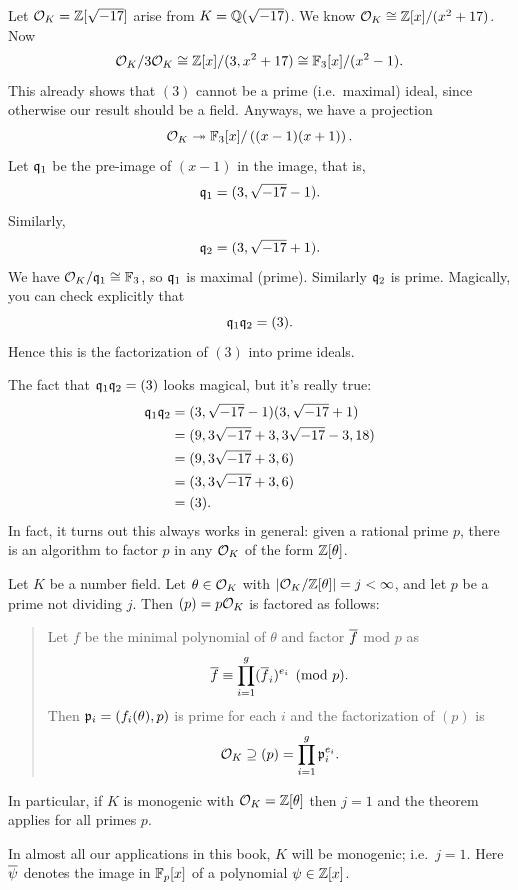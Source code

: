 \begin{example}
	Let $\mathcal O_K = \mathbb Z[\sqrt{-17}]$ arise from $K = \mathbb Q(\sqrt{-17})$.
	We know $\mathcal O_K \cong \mathbb Z[x] / (x^2+17)$.
	Now
	\[
		\mathcal O_K / 3\mathcal O_K \cong \mathbb Z[x] / (3,x^2+17)
		\cong \mathbb F_3[x] / (x^2-1).
	\]
	This already shows that $(3)$ cannot be a prime (i.e.\ maximal) ideal,
	since otherwise our result should be a field.
	Anyways, we have a projection
	\[ \mathcal O_K \twoheadrightarrow \mathbb F_3[x] / \left( (x-1)(x+1) \right). \]
	Let $\mathfrak q_1$ be the pre-image of $(x-1)$ in the image, that is,
	\[ \mathfrak q_1 = (3, \sqrt{-17}-1). \]
	Similarly, \[ \mathfrak q_2 = (3, \sqrt{-17}+1). \]
	We have $\mathcal O_K / \mathfrak q_1 \cong \mathbb F_3$, so $\mathfrak q_1$ is maximal (prime).
	Similarly $\mathfrak q_2$ is prime.
	Magically, you can check explicitly that
	\[ \mathfrak q_1 \mathfrak q_2 = (3). \]
	Hence this is the factorization of $(3)$ into prime ideals.
\end{example}

The fact that $\mathfrak q_1 \mathfrak q_2 = (3)$ looks magical, but it's really true:
\begin{align*}
	\mathfrak q_1\mathfrak q_2
	&= (3, \sqrt{-17}-1) (3, \sqrt{-17}+1) \\
	&= (9, 3\sqrt{-17}+3, 3\sqrt{-17}-3, 18) \\
	&= (9, 3\sqrt{-17}+3, 6) \\
	&= (3, 3\sqrt{-17}+3, 6) \\
	&= (3).
\end{align*}
In fact, it turns out this always works in general:
given a rational prime $p$, there is an algorithm
to factor $p$ in any $\mathcal O_K$ of the form $\mathbb Z[\theta]$.

\begin{theorem}
	\label{thm:factor_alg}
	Let $K$ be a number field.
	Let $\theta \in \mathcal O_K$ with $|\mathcal O_K / \mathbb Z[\theta]| = j < \infty$,
	and let $p$ be a prime not dividing $j$.
	Then $(p) = p \mathcal O_K$ is factored as follows:
	\begin{quote}
		Let $f$ be the minimal polynomial of $\theta$ and
		factor $\overline f$ mod $p$ as
		\[ \overline f \equiv \prod_{i=1}^g (\overline f_i)^{e_i} \pmod p. \]
		Then $\mathfrak p_i = (f_i(\theta), p)$ is prime for each $i$
		and the factorization of $(p)$ is
		\[ \mathcal O_K \supseteq (p) = \prod_{i=1}^g \mathfrak p_i^{e_i}. \]
	\end{quote}
	In particular, if $K$ is monogenic with $\mathcal O_K = \mathbb Z[\theta]$ then $j=1$
	and the theorem applies for all primes $p$.
\end{theorem}
In almost all our applications in this book, $K$ will be monogenic; i.e.\ $j=1$.
Here $\overline \psi$ denotes the image in $\mathbb F_p[x]$ of a polynomial $\psi \in \mathbb Z[x]$.

